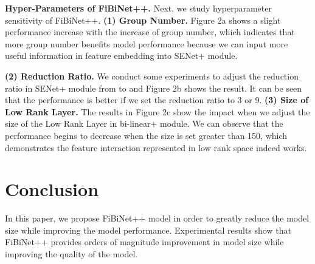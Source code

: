 \documentclass[sigconf]{acmart}
\begin{document}
\textbf{Hyper-Parameters of FiBiNet++.} Next, we study hyperparameter sensitivity of FiBiNet++. 
\textbf{ (1) Group Number.}  Figure 2a shows a slight performance increase with the increase of group number, which indicates that more group number benefits model performance because we can input more useful information in feature embedding into SENet+ module.

\textbf{ (2) Reduction Ratio.} We conduct some experiments to adjust the reduction ratio in SENet+ module from  to  and Figure 2b shows the result. It can be seen that the performance is better if we set the reduction ratio  to 3 or 9.
\textbf{ (3) Size of Low Rank Layer.} The results in Figure 2c show the impact when we adjust the size of the Low Rank Layer in bi-linear+ module. We can observe that the performance begins to decrease when the size is set greater than 150, which demonstrates the feature interaction represented in low rank space indeed works.
\begin{table}
\centering
\caption{Training and reference efficiency comparison}
\label{tab:training}
\end{table}

\section{Conclusion}
In this paper, we propose FiBiNet++ model in order to greatly reduce the model size while improving the model performance. Experimental results show that FiBiNet++ provides orders of magnitude improvement in model size while improving the quality of the model. 






\balance

\end{document}
